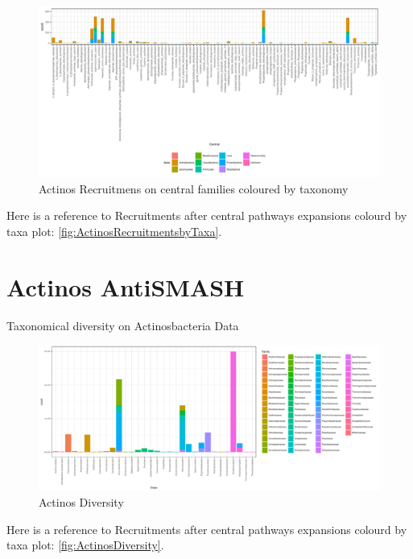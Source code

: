 \documentclass[12pt,twoside]{reedthesis}
\begin{document}
  \begin{figure}[h!tbp]
  \centering
  \includegraphics[angle = 0,scale = 0.5]{chapter2/Actinobacteria/ActinosRecruitmentsbyTaxa.pdf}
  \caption[Actinos Recruitmens on central families coloured by taxonomy]{\normalsize{Actinos Recruitmens on central families coloured by taxonomy}}
  \label{fig:ActinosRecruitmentsbyTaxa}
  \end{figure}
  
  Here is a reference to Recruitments after central pathways expansions
  colourd by taxa plot: \autoref{fig:ActinosRecruitmentsbyTaxa}.
  \clearpage 
  
  \section{Actinos AntiSMASH}\label{actinos-antismash}
  
  Taxonomical diversity on Actinosbacteria Data
  
  \begin{figure}[h!tbp]
  \centering
  \includegraphics[angle = 0,scale = 0.6]{chapter2/Actinobacteria/ActinosDiversity.pdf}
  \caption[Actinos Diversity]{\normalsize{Actinos Diversity}}
  \label{fig:ActinosDiversity}
  \end{figure}
  
  Here is a reference to Recruitments after central pathways expansions
  colourd by taxa plot: \autoref{fig:ActinosDiversity}. \clearpage
  
\end{document}
